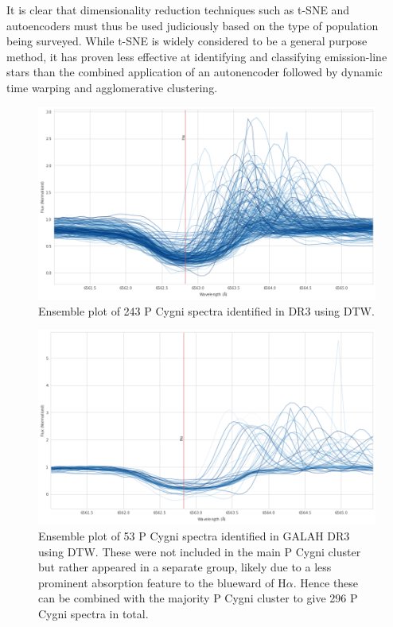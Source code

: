 It is clear that dimensionality reduction techniques such as t-SNE and autoencoders must thus be used judiciously based on the type of population being surveyed. While t-SNE is widely considered to be a general purpose method, it has proven less effective at identifying and classifying emission-line stars than the combined application of an autonencoder followed by dynamic time warping and agglomerative clustering. 

\begin{figure}[!htb]
\centering
\includegraphics[scale=0.45]{figures/p cygni ensemble.png}
\caption{Ensemble plot of 243 P Cygni spectra identified in DR3 using DTW.}
\end{figure}

\begin{figure}[!htb]
\centering
\includegraphics[scale=0.45]{figures/p cugni 2.png}
\caption{Ensemble plot of 53 P Cygni spectra identified in GALAH DR3 using DTW. These were not included in the main P Cygni cluster but rather appeared in a separate group, likely due to a less prominent absorption feature to the blueward of H$\alpha$. Hence these can be combined with the majority P Cygni cluster to give 296 P Cygni spectra in total.}
\end{figure}

